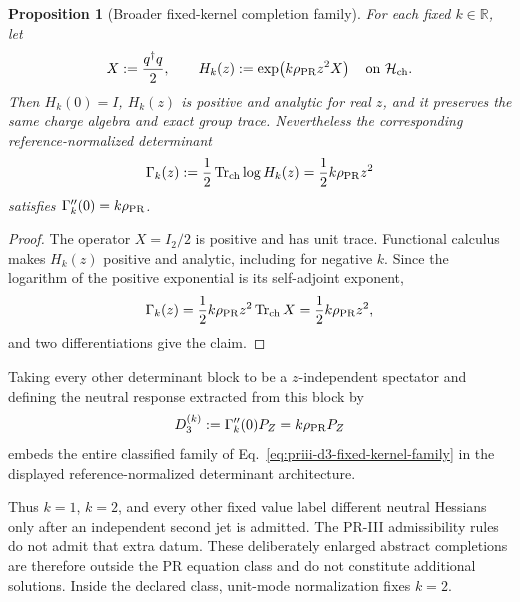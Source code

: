 \documentclass[11pt]{article}
\newtheorem{proposition}[theorem]{Proposition}
\begin{document}
\begin{proposition}[Broader fixed-kernel completion family]
\label{prop:priii-fixed-kernel-counterfamily}
For each fixed \(k\in\mathbb R\), let
\begin{equation}
X:=\frac{q^\dagger q}{2},
\qquad
H_k(z):=\exp\!\left(k\rho_{\rm PR}z^2X\right)
\quad\hbox{on }\mathcal H_{\rm ch}.
\label{eq:priii-neutral-counterfamily}
\end{equation}
Then \(H_k(0)=I\), \(H_k(z)\) is positive and analytic for real \(z\), and it preserves the same
charge algebra and exact group trace.  Nevertheless the corresponding reference-normalized
determinant
\begin{equation}
\Gamma_k(z)
:=
\frac12\operatorname{Tr}_{\rm ch}\log H_k(z)
=
\frac12k\rho_{\rm PR}z^2
\end{equation}
satisfies \(\Gamma_k''(0)=k\rho_{\rm PR}\).
\end{proposition}

\begin{proof}
The operator \(X=I_2/2\) is positive and has unit trace.  Functional calculus makes
\(H_k(z)\) positive and analytic, including for negative \(k\).  Since the logarithm of the
positive exponential is its self-adjoint exponent,
\begin{equation}
\Gamma_k(z)
=
\frac12 k\rho_{\rm PR}z^2\operatorname{Tr}_{\rm ch}X
=
\frac12 k\rho_{\rm PR}z^2,
\end{equation}
and two differentiations give the claim.
\end{proof}

Taking every other determinant block to be a \(z\)-independent spectator and defining the neutral
response extracted from this block by
\begin{equation}
D_3^{(k)}
:=
\Gamma_k''(0)P_Z
=
k\rho_{\rm PR}P_Z
\label{eq:priii-counterfamily-d3-response}
\end{equation}
embeds the entire classified family of Eq.~\eqref{eq:priii-d3-fixed-kernel-family} in the displayed
reference-normalized determinant architecture.

Thus \(k=1\), \(k=2\), and every other fixed value label different neutral
Hessians only after an independent second jet is admitted.  The PR-III
admissibility rules do not admit that extra datum.  These deliberately enlarged
abstract completions are therefore outside the PR equation class and do not
constitute additional solutions.  Inside the declared class, unit-mode
normalization fixes \(k=2\).
\end{document}
